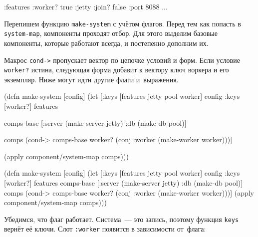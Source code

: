 
\begin{english}
  \begin{clojure}
{:features {:worker? true}
 :jetty {:join? false :port 8088}
 ...}
  \end{clojure}
\end{english}

Перепишем функцию \verb|make-system| с учётом флагов. Перед тем как попасть в
\verb|system-map|, компоненты проходят отбор. Для этого выделим базовые
компоненты, которые работают всегда, и постепенно дополним их.

Макрос \verb|cond->| пропускает вектор по цепочке условий и форм. Если условие
\verb|worker?| истина, следующая форма добавит к вектору ключ воркера и его
экземпляр. Ниже могут идти другие флаги и~выражения.

\ifnarrow

\begin{english}
  \begin{clojure}
(defn make-system [config]
  (let [{:keys [features
                jetty
                pool
                worker]} config
        {:keys [worker?]} features

        comps-base
        [:server (make-server jetty)
         :db     (make-db pool)]

        comps (cond-> comps-base
                worker?
                (conj :worker
                  (make-worker worker)))]

    (apply component/system-map comps)))
  \end{clojure}
\end{english}

\else

\begin{english}
  \begin{clojure}
(defn make-system [config]
  (let [{:keys [features jetty pool worker]} config
        {:keys [worker?]} features
        comps-base [:server (make-server jetty)
                    :db (make-db pool)]
        comps (cond-> comps-base
                worker?
                (conj :worker (make-worker worker)))]
    (apply component/system-map comps)))
  \end{clojure}
\end{english}

\fi

Убедимся, что флаг работает. Система~--- это запись, поэтому функция \verb|keys|
вернёт её ключи. Слот \verb|:worker| появится в зависимости от~флага:

